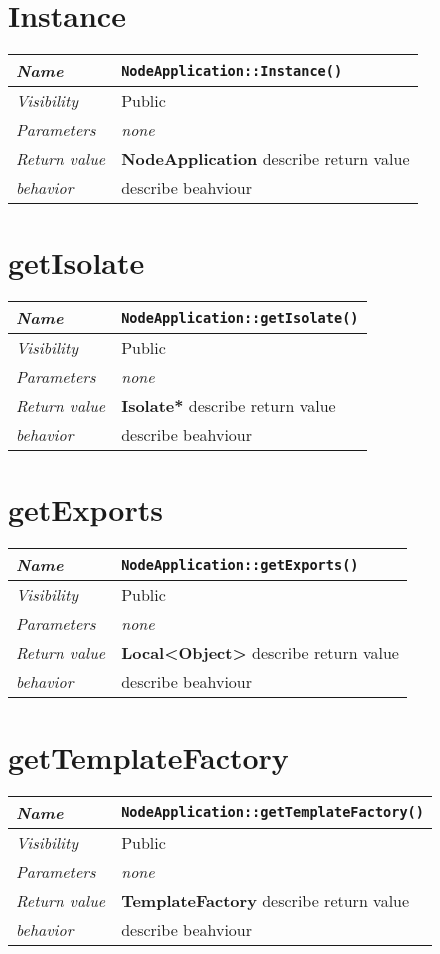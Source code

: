  \section{Instance}
\begin{longtable}{p{3cm} @{\hskip 1cm} p{12cm}}
 \hline
\textit{Name} & \texttt{NodeApplication::Instance()}\\
\hline
 \textit{Visibility} & Public \\
\hline
\textit{Parameters} & \textit{none}\\
\hline
\textit{Return value} & \textbf{ NodeApplication} describe return value\\
  \hline
 \textit{behavior} & describe beahviour \\
\hline
\end{longtable} \pagebreak
 \section{getIsolate}
\begin{longtable}{p{3cm} @{\hskip 1cm} p{12cm}}
 \hline
\textit{Name} & \texttt{NodeApplication::getIsolate()}\\
\hline
 \textit{Visibility} & Public \\
\hline
\textit{Parameters} & \textit{none}\\
\hline
\textit{Return value} & \textbf{ Isolate*} describe return value\\
  \hline
 \textit{behavior} & describe beahviour \\
\hline
\end{longtable} \pagebreak
 \section{getExports}
\begin{longtable}{p{3cm} @{\hskip 1cm} p{12cm}}
 \hline
\textit{Name} & \texttt{NodeApplication::getExports()}\\
\hline
 \textit{Visibility} & Public \\
\hline
\textit{Parameters} & \textit{none}\\
\hline
\textit{Return value} & \textbf{ Local<Object>} describe return value\\
  \hline
 \textit{behavior} & describe beahviour \\
\hline
\end{longtable} \pagebreak
 \section{getTemplateFactory}
\begin{longtable}{p{3cm} @{\hskip 1cm} p{12cm}}
 \hline
\textit{Name} & \texttt{NodeApplication::getTemplateFactory()}\\
\hline
 \textit{Visibility} & Public \\
\hline
\textit{Parameters} & \textit{none}\\
\hline
\textit{Return value} & \textbf{ TemplateFactory} describe return value\\
  \hline
 \textit{behavior} & describe beahviour \\
\hline
\end{longtable} \pagebreak
